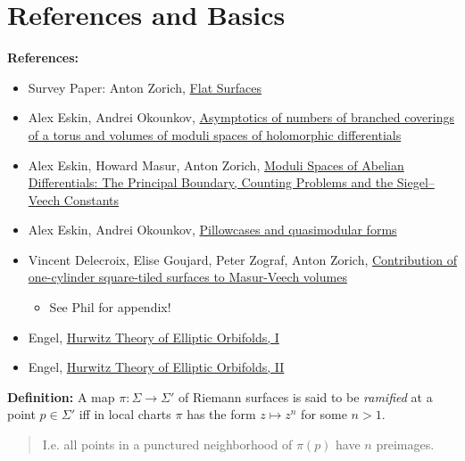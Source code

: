 \newpage
\tableofcontents

\hypertarget{references-and-basics}{%
\section{References and Basics}\label{references-and-basics}}

\textbf{References:}

\begin{itemize}
\tightlist
\item
  Survey Paper: Anton Zorich,
  \href{https://arxiv.org/abs/math/0609392}{Flat Surfaces}
\item
  Alex Eskin, Andrei Okounkov,
  \href{https://arxiv.org/abs/math/0006171}{Asymptotics of numbers of
  branched coverings of a torus and volumes of moduli spaces of
  holomorphic differentials}
\item
  Alex Eskin, Howard Masur, Anton Zorich,
  \href{https://arxiv.org/abs/math/0202134}{Moduli Spaces of Abelian
  Differentials: The Principal Boundary, Counting Problems and the
  Siegel--Veech Constants}
\item
  Alex Eskin, Andrei Okounkov,
  \href{https://arxiv.org/abs/math/0505545}{Pillowcases and quasimodular
  forms}
\item
  Vincent Delecroix, Elise Goujard, Peter Zograf, Anton Zorich,
  \href{https://arxiv.org/abs/1903.10904}{Contribution of one-cylinder
  square-tiled surfaces to Masur-Veech volumes}

  \begin{itemize}
  \tightlist
  \item
    See Phil for appendix!
  \end{itemize}
\item
  Engel, \href{https://arxiv.org/abs/1706.06738}{Hurwitz Theory of
  Elliptic Orbifolds, I}
\item
  Engel, \href{https://arxiv.org/abs/1809.07434}{Hurwitz Theory of
  Elliptic Orbifolds, II}
\end{itemize}

\textbf{Definition:} A map \(\pi: \Sigma \to \Sigma'\) of Riemann
surfaces is said to be \emph{ramified} at a point \(p\in \Sigma'\) iff
in local charts \(\pi\) has the form \(z\mapsto z^n\) for some \(n>1\).

\begin{quote}
I.e. all points in a punctured neighborhood of \(\pi(p)\) have \(n\)
preimages.
\end{quote}

